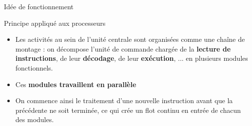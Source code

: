 %
\begin{Frame}{Idée de fonctionnement}
%    

\begin{block}{Principe appliqué aux processeurs}
       \begin{center}
 	\begin{itemize}
         \item Les activités au sein de l'unité centrale sont organisées comme une chaîne de montage : on décompose l'unité de commande chargée de la \textbf{lecture de instructions}, de leur \textbf{décodage}, de leur \textbf{exécution}, ... en plusieurs modules fonctionnels.
	\item Ces \textbf{modules travaillent en parallèle}
	\item On commence ainsi le traitement d'une nouvelle instruction avant que la précédente ne soit terminée, ce qui crée un flot continu en entrée de chacun des modules.
        \end{itemize}
       \end{center}
      \end{block}   



\end{Frame}


